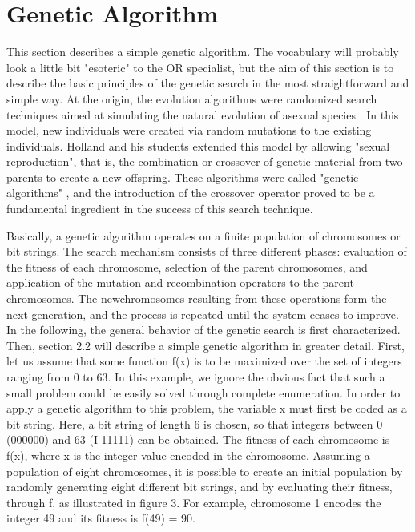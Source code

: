     \section{Genetic Algorithm}

    \begin{algorithm}
        This section describes a simple genetic algorithm. The vocabulary will probably look a little bit "esoteric" to the OR specialist, but the aim of this section is to describe the basic principles of the genetic search in the most straightforward and simple way. 
        At the origin, the evolution algorithms were randomized search techniques aimed at simulating the natural evolution of asexual species .
        In this model, new individuals were created via random mutations to the existing individuals. Holland and his students extended this model by allowing "sexual reproduction", that is, the combination or crossover of genetic material from two parents to create a new offspring. These algorithms were called "genetic algorithms" , and the introduction of the crossover operator proved to be a fundamental ingredient in the success of this search technique. 

        Basically, a genetic algorithm operates on a finite population of chromosomes or bit strings.
        The search mechanism consists of three different phases: evaluation of the fitness of each chromosome, selection of the parent chromosomes, and application of the mutation and recombination operators to the parent chromosomes.
        The newchromosomes resulting from these operations form the next generation, and the process is repeated until the system ceases to improve. In the following, the general behavior of the genetic search is first characterized. Then, section 2.2 will describe a simple genetic algorithm in greater detail.
        First, let us assume that some function f(x) is to be maximized over the set of integers ranging from 0 to 63. In this example, we ignore the obvious fact that such a small problem could be easily solved through complete enumeration.
        In order to apply a genetic algorithm to this problem, the variable x must first be coded as a bit string.
       Here, a bit string of length 6 is chosen, so that integers between 0 (000000) and 63 (I 11111) can be obtained. The fitness of each chromosome is f(x), where x is the integer value encoded in the chromosome.
       Assuming a population of eight chromosomes, it is possible to create an initial population by randomly generating  eight different bit strings, and by evaluating their fitness, through f, as illustrated in figure 3. For example, chromosome 1 encodes the integer 49 and its fitness is f(49) = 90.

\end{algorithm}
